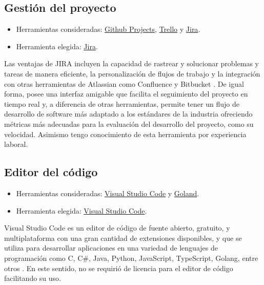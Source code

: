 \subsection{Gestión del proyecto}
\begin{itemize}
\tightlist
\item
  Herramientas consideradas:
  \href{https://github.com/features/issues}{Github Projects},
  \href{https://trello.com/home)}{Trello} y \href{https://www.atlassian.com/es/software/jira}{Jira}.
\item
  Herramienta elegida: \href{https://www.atlassian.com/es/software/jira)}{Jira}.
\end{itemize}
Las ventajas de JIRA incluyen la capacidad de rastrear y solucionar problemas y tareas de manera eficiente, la personalización de flujos de trabajo y la integración con otras herramientas de Atlassian como Confluence y Bitbucket \cite{art:jira_osman}. De igual forma, posee una interfaz amigable que facilita el seguimiento del proyecto en tiempo real y, a diferencia de otras herramientas, permite tener un flujo de desarrollo de software más adaptado a los estándares de la industria ofreciendo métricas más adecuadas para la evaluación del desarrollo del proyecto, como su velocidad. Asimismo tengo conocimiento de esta herramienta por experiencia laboral.

\subsection{Editor del código}
\begin{itemize}
\tightlist
\item
  Herramientas consideradas:
  \href{https://code.visualstudio.com/}{Visual Studio Code} y 
  \href{https://www.jetbrains.com/go/)}{Goland}.
\item
  Herramienta elegida: \href{https://code.visualstudio.com/}{Visual Studio Code}.
\end{itemize}
Visual Studio Code es un editor de código de fuente abierto, gratuito, y multiplataforma con una gran cantidad de extensiones disponibles, y que se utiliza para desarrollar aplicaciones en una variedad de lenguajes de programación como C, C\#, Java, Python, JavaScript, TypeScript, Golang, entre otros \cite{art:visual_code_flores}. En este sentido, no se requirió de licencia para el editor de código facilitando su uso.

